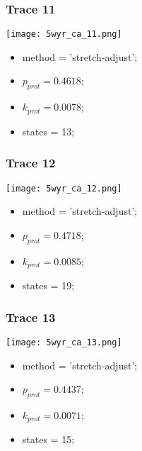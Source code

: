 \subsubsection{Trace 11}
\begin{minipage}[c]{0.7\textwidth}
    \texttt{[image: 5wyr\_ca\_11.png]}
\end{minipage}
\hfill
\begin{minipage}[c]{0.45\textwidth}
    \begin{itemize}
        \item method = 'stretch-adjust';
        \item $p_{prot}=0.4618$;
        \item $k_{prot}=0.0078$;
        \item states = 13;
    \end{itemize}
\end{minipage}

\subsubsection{Trace 12}
\begin{minipage}[c]{0.7\textwidth}
    \texttt{[image: 5wyr\_ca\_12.png]}
\end{minipage}
\hfill
\begin{minipage}[c]{0.45\textwidth}
    \begin{itemize}
        \item method = 'stretch-adjust';
        \item $p_{prot}=0.4718$;
        \item $k_{prot}=0.0085$;
        \item states = 19;
    \end{itemize}
\end{minipage}

\subsubsection{Trace 13}
\begin{minipage}[c]{0.7\textwidth}
    \texttt{[image: 5wyr\_ca\_13.png]}
\end{minipage}
\hfill
\begin{minipage}[c]{0.45\textwidth}
    \begin{itemize}
        \item method = 'stretch-adjust';
        \item $p_{prot}=0.4437$;
        \item $k_{prot}=0.0071$;
        \item states = 15;
    \end{itemize}
\end{minipage}

